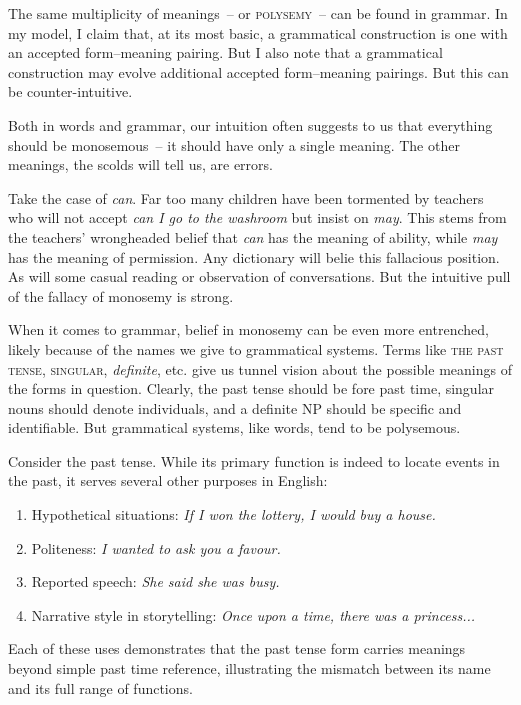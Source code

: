 The same multiplicity of meanings~-- or \textsc{polysemy}~-- can be found in grammar. In my model, I claim that, at its most basic, a grammatical construction is one with an accepted form--meaning pairing. But I also note that a grammatical construction may evolve additional accepted form--meaning pairings. But this can be counter-intuitive.

Both in words and grammar, our intuition often suggests to us that everything should be monosemous~-- it should have only a single meaning. The other meanings, the scolds will tell us, are errors.

Take the case of \textit{can}. Far too many children have been tormented by teachers who will not accept \textit{can I go to the washroom} but insist on \textit{may}. This stems from the teachers' wrongheaded belief that \textit{can} has the meaning of ability, while \textit{may} has the meaning of permission. Any dictionary will belie this fallacious position. As will some casual reading or observation of conversations. But the intuitive pull of the fallacy of monosemy is strong.

When it comes to grammar, belief in monosemy can be even more entrenched, likely because of the names we give to grammatical systems. Terms like \textsc{the past tense}, \textsc{singular}, \textit{definite}, etc. give us tunnel vision about the possible meanings of the forms in question. Clearly, the past tense should be fore past time, singular nouns should denote individuals, and a definite NP should be specific and identifiable. But grammatical systems, like words, tend to be polysemous.

Consider the past tense. While its primary function is indeed to locate events in the past, it serves several other purposes in English:

\begin{enumerate}
    \item Hypothetical situations: \textit{If I won the lottery, I would buy a house.}
    \item Politeness: \textit{I wanted to ask you a favour.}
    \item Reported speech: \textit{She said she was busy.}
    \item Narrative style in storytelling: \textit{Once upon a time, there was a princess...}
\end{enumerate}

Each of these uses demonstrates that the past tense form carries meanings beyond simple past time reference, illustrating the mismatch between its name and its full range of functions.

